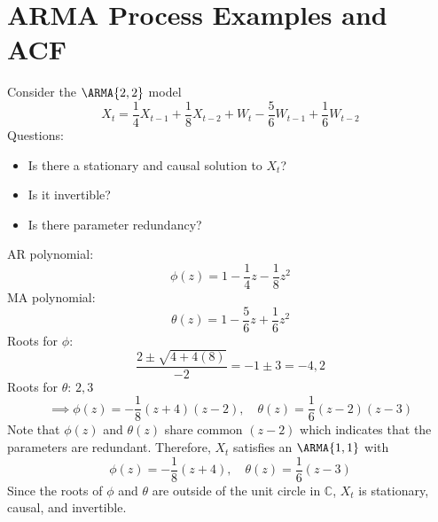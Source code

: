 \section{ARMA Process Examples and ACF}
\begin{Example}{}{}
    Consider the $ \ARMA{2,2} $ model
    \[ X_t= \frac{1}{4}X_{t-1} + \frac{1}{8} X_{t-2} + W_t - \frac{5}{6}W_{t-1} +\frac{1}{6}W_{t-2} \]
    Questions:
    {\color{blue}
    \begin{itemize}
        \item Is there a stationary and causal solution to $X_t$?
        \item Is it invertible?
        \item Is there parameter redundancy?
    \end{itemize}}
    AR polynomial:
    \[ \phi(z)=1-\frac{1}{4}z- \frac{1}{8}z^2  \]
    MA polynomial:
    \[ \theta(z)= 1-\frac{5}{6}z + \frac{1}{6}z^2\]
    Roots for $\phi$:
    \[ \frac{2 \pm \sqrt{4+ 4(8)}}{-2} =-1 \pm 3=-4,2 \]
    Roots for $\theta$: $ 2,3 $
    \[ \implies \phi(z)= -\frac{1}{8}(z+4)(z-2), \quad  \theta(z) = \frac{1}{6}(z-2)(z-3)\]
    Note that $\phi (z)$ and $\theta (z)$ share common $(z-2)$ which indicates
    that the parameters are redundant.
    Therefore, $X_t$ satisfies an $ \ARMA{1,1} $ with
    \[\phi(z)=-\frac{1}{8}(z+4), \quad \theta(z)= \frac{1}{6}(z-3)\]
    Since the roots of $\phi$ and $\theta$ are
    outside of the unit circle in $\mathbb{C}$, $X_t$ is
    stationary, causal, and invertible.
\end{Example}
